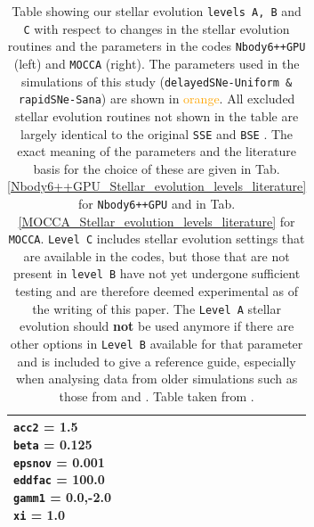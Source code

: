 \begin{table}
\begin{tabular}{|l|l|l|l|l|}
				\makecell{\texttt{acc2} = 1.5 \\ \texttt{beta} = 0.125 \\ \texttt{epsnov} = 0.001 \\ \texttt{eddfac} = 100.0 \\ \texttt{gamm1} = 0.0,-2.0 \\ \texttt{xi} = 1.0} \\
				\hline \hline
			\end{tabular}
			\caption{Table showing our stellar evolution \texttt{levels A, B} and \texttt{C} with respect to changes in the stellar evolution routines and the parameters in the codes \texttt{Nbody6++GPU} (left) and \texttt{MOCCA} (right). The parameters used in the simulations of this study (\texttt{delayedSNe-Uniform \& rapidSNe-Sana}) are shown in \textcolor{orange}{orange}. All excluded stellar evolution routines not shown in the table are largely identical to the original \texttt{SSE} and \texttt{BSE} \cite{Hurley2000,Hurley2002}. The exact meaning of the parameters and the literature basis for the choice of these are given in Tab.\ref{Nbody6++GPU_Stellar_evolution_levels_literature} for \texttt{Nbody6++GPU} and in Tab.\ref{MOCCA_Stellar_evolution_levels_literature} for \texttt{MOCCA}. \texttt{Level C} includes stellar evolution settings that are available in the codes, but those that are not present in \texttt{level B} have not yet undergone sufficient testing and are therefore deemed experimental as of the writing of this paper.
				The \texttt{Level A} stellar evolution should \textbf{not} be used anymore if there are other options in \texttt{Level B} available for that parameter and is included to give a reference guide, especially when analysing data from older simulations such as those from \cite{Wang2016} and \cite{Panamarev2019}. Table taken from \cite{Kamlah2022}.}
			\label{Stellar_evolution_levels_parameters}
		\end{table}
	\endgroup
	
